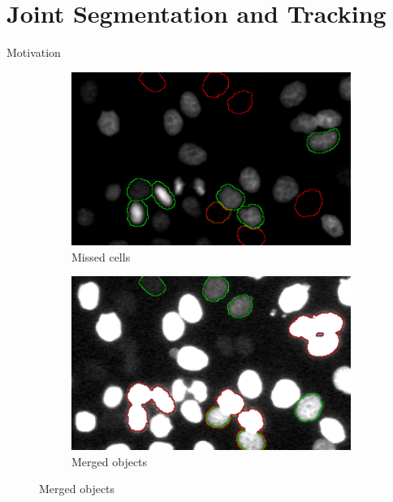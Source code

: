 \section{Joint Segmentation and Tracking}

\begin{frame}{Motivation}
    \begin{figure}
        \centering
        \begin{subfigure}[t]{0.48\textwidth}
            \includegraphics[width=\textwidth]{images/joint/mitocheck_255_max.pdf}
            \caption{Missed cells}
            \label{fig:joint-underseg-no-detection}
        \end{subfigure}
        \hfill
        \begin{subfigure}[t]{0.48\textwidth}
            \includegraphics[width=\textwidth]{images/joint/mitocheck_030_max.pdf}
            \caption{Merged objects}
            \label{fig:joint-underseg-mergers}
        \end{subfigure}
    \end{figure}

\end{frame}

